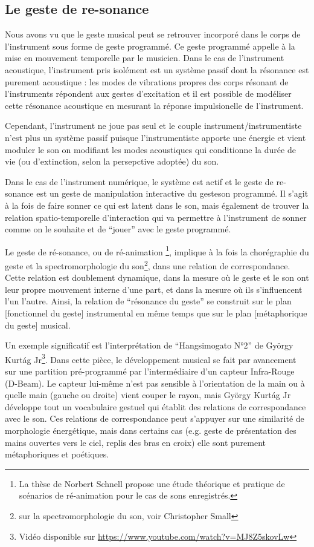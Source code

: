\subsection{Le geste de re-sonance}

Nous avons vu que le geste musical peut se retrouver incorporé dans le corps de l'instrument sous forme de geste programmé. Ce geste programmé appelle à la mise en mouvement temporelle par le musicien.
Dans le cas de l'instrument acoustique, l'instrument pris isolément est un système passif dont la résonance est purement acoustique : les modes de vibrations propres des corps résonant de l'instruments répondent aux gestes d'excitation et il est possible de modéliser cette résonance acoustique en mesurant la réponse impulsionelle de l'instrument.

Cependant, l'instrument ne joue pas seul et le couple instrument/instrumentiste n'est plus un système passif puisque l'instrumentiste apporte une énergie et vient moduler le son on modifiant les modes acoustiques qui conditionne la durée de vie (ou d'extinction, selon la persepctive adoptée) du son.

Dans le cas de l'instrument numérique, le système est actif et le geste de re-sonance est un geste de manipulation interactive du geste\/son programmé.
Il s'agit à la fois de faire sonner ce qui est latent dans le son, mais également de trouver la relation spatio-temporelle d'interaction qui va permettre à l'instrument de sonner comme on le souhaite et de ``jouer'' avec le geste programmé.

Le geste de ré-sonance, ou de ré-animation \footnote{La thèse de Norbert Schnell \cite{schnell_playing_2013} propose une étude théorique et pratique de scénarios de ré-animation pour le cas de sons enregistrés.}, implique à la fois la chorégraphie du geste et la spectromorphologie du son\footnote{sur la spectromorphologie du son, voir Christopher Small}, dans une relation de correspondance. Cette relation est doublement dynamique, dans la mesure où le geste et le son ont leur propre mouvement interne d'une part, et dans la mesure où ils s'influencent l'un l'autre. Ainsi, la relation de ``résonance du geste'' se construit sur le plan [fonctionnel du geste] instrumental en même temps que sur le plan [métaphorique du geste] musical.

Un exemple significatif est l'interprétation de ``Hangsimogato N°2'' de György Kurtág Jr\footnote{Vidéo disponible sur \url{https://www.youtube.com/watch?v=MJ8Z5skovLw}}. Dans cette pièce, le développement musical se fait par avancement sur une partition pré-programmé par l'intermédiaire d'un capteur Infra-Rouge (D-Beam). Le capteur lui-même n'est pas sensible à l'orientation de la main ou à quelle main (gauche ou droite) vient couper le rayon, mais György Kurtág Jr développe tout un vocabulaire gestuel qui établit des relations de correspondance avec le son. Ces relations de correspondance peut s'appuyer sur une similarité de morphologie énergétique, mais dans certains cas (e.g. geste de présentation des mains ouvertes vers le ciel, replis des bras en croix) elle sont purement métaphoriques et poétiques.

